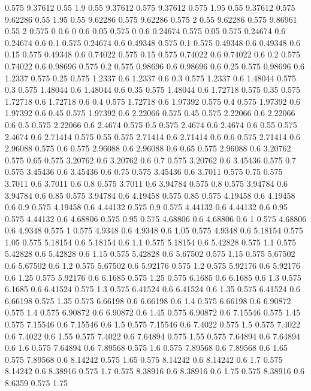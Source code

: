 0.575 9.37612
0.55 1.9
0.55 9.37612
0.575 9.37612
0.575 1.95
0.55 9.37612
0.575 9.62286
0.55 1.95
0.55 9.62286
0.575 9.62286
0.575 2
0.55 9.62286
0.575 9.86961
0.55 2
0.575 0
0.6 0
0.6 0.05
0.575 0
0.6 0.24674
0.575 0.05
0.575 0.24674
0.6 0.24674
0.6 0.1
0.575 0.24674
0.6 0.49348
0.575 0.1
0.575 0.49348
0.6 0.49348
0.6 0.15
0.575 0.49348
0.6 0.74022
0.575 0.15
0.575 0.74022
0.6 0.74022
0.6 0.2
0.575 0.74022
0.6 0.98696
0.575 0.2
0.575 0.98696
0.6 0.98696
0.6 0.25
0.575 0.98696
0.6 1.2337
0.575 0.25
0.575 1.2337
0.6 1.2337
0.6 0.3
0.575 1.2337
0.6 1.48044
0.575 0.3
0.575 1.48044
0.6 1.48044
0.6 0.35
0.575 1.48044
0.6 1.72718
0.575 0.35
0.575 1.72718
0.6 1.72718
0.6 0.4
0.575 1.72718
0.6 1.97392
0.575 0.4
0.575 1.97392
0.6 1.97392
0.6 0.45
0.575 1.97392
0.6 2.22066
0.575 0.45
0.575 2.22066
0.6 2.22066
0.6 0.5
0.575 2.22066
0.6 2.4674
0.575 0.5
0.575 2.4674
0.6 2.4674
0.6 0.55
0.575 2.4674
0.6 2.71414
0.575 0.55
0.575 2.71414
0.6 2.71414
0.6 0.6
0.575 2.71414
0.6 2.96088
0.575 0.6
0.575 2.96088
0.6 2.96088
0.6 0.65
0.575 2.96088
0.6 3.20762
0.575 0.65
0.575 3.20762
0.6 3.20762
0.6 0.7
0.575 3.20762
0.6 3.45436
0.575 0.7
0.575 3.45436
0.6 3.45436
0.6 0.75
0.575 3.45436
0.6 3.7011
0.575 0.75
0.575 3.7011
0.6 3.7011
0.6 0.8
0.575 3.7011
0.6 3.94784
0.575 0.8
0.575 3.94784
0.6 3.94784
0.6 0.85
0.575 3.94784
0.6 4.19458
0.575 0.85
0.575 4.19458
0.6 4.19458
0.6 0.9
0.575 4.19458
0.6 4.44132
0.575 0.9
0.575 4.44132
0.6 4.44132
0.6 0.95
0.575 4.44132
0.6 4.68806
0.575 0.95
0.575 4.68806
0.6 4.68806
0.6 1
0.575 4.68806
0.6 4.9348
0.575 1
0.575 4.9348
0.6 4.9348
0.6 1.05
0.575 4.9348
0.6 5.18154
0.575 1.05
0.575 5.18154
0.6 5.18154
0.6 1.1
0.575 5.18154
0.6 5.42828
0.575 1.1
0.575 5.42828
0.6 5.42828
0.6 1.15
0.575 5.42828
0.6 5.67502
0.575 1.15
0.575 5.67502
0.6 5.67502
0.6 1.2
0.575 5.67502
0.6 5.92176
0.575 1.2
0.575 5.92176
0.6 5.92176
0.6 1.25
0.575 5.92176
0.6 6.1685
0.575 1.25
0.575 6.1685
0.6 6.1685
0.6 1.3
0.575 6.1685
0.6 6.41524
0.575 1.3
0.575 6.41524
0.6 6.41524
0.6 1.35
0.575 6.41524
0.6 6.66198
0.575 1.35
0.575 6.66198
0.6 6.66198
0.6 1.4
0.575 6.66198
0.6 6.90872
0.575 1.4
0.575 6.90872
0.6 6.90872
0.6 1.45
0.575 6.90872
0.6 7.15546
0.575 1.45
0.575 7.15546
0.6 7.15546
0.6 1.5
0.575 7.15546
0.6 7.4022
0.575 1.5
0.575 7.4022
0.6 7.4022
0.6 1.55
0.575 7.4022
0.6 7.64894
0.575 1.55
0.575 7.64894
0.6 7.64894
0.6 1.6
0.575 7.64894
0.6 7.89568
0.575 1.6
0.575 7.89568
0.6 7.89568
0.6 1.65
0.575 7.89568
0.6 8.14242
0.575 1.65
0.575 8.14242
0.6 8.14242
0.6 1.7
0.575 8.14242
0.6 8.38916
0.575 1.7
0.575 8.38916
0.6 8.38916
0.6 1.75
0.575 8.38916
0.6 8.6359
0.575 1.75
